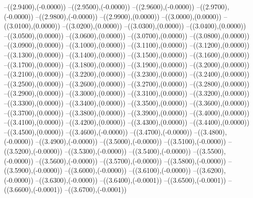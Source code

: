{	--({\sx*(2.9400)},{\sy*(-0.0000)})
	--({\sx*(2.9500)},{\sy*(-0.0000)})
	--({\sx*(2.9600)},{\sy*(-0.0000)})
	--({\sx*(2.9700)},{\sy*(-0.0000)})
	--({\sx*(2.9800)},{\sy*(-0.0000)})
	--({\sx*(2.9900)},{\sy*(0.0000)})
	--({\sx*(3.0000)},{\sy*(0.0000)})
	--({\sx*(3.0100)},{\sy*(0.0000)})
	--({\sx*(3.0200)},{\sy*(0.0000)})
	--({\sx*(3.0300)},{\sy*(0.0000)})
	--({\sx*(3.0400)},{\sy*(0.0000)})
	--({\sx*(3.0500)},{\sy*(0.0000)})
	--({\sx*(3.0600)},{\sy*(0.0000)})
	--({\sx*(3.0700)},{\sy*(0.0000)})
	--({\sx*(3.0800)},{\sy*(0.0000)})
	--({\sx*(3.0900)},{\sy*(0.0000)})
	--({\sx*(3.1000)},{\sy*(0.0000)})
	--({\sx*(3.1100)},{\sy*(0.0000)})
	--({\sx*(3.1200)},{\sy*(0.0000)})
	--({\sx*(3.1300)},{\sy*(0.0000)})
	--({\sx*(3.1400)},{\sy*(0.0000)})
	--({\sx*(3.1500)},{\sy*(0.0000)})
	--({\sx*(3.1600)},{\sy*(0.0000)})
	--({\sx*(3.1700)},{\sy*(0.0000)})
	--({\sx*(3.1800)},{\sy*(0.0000)})
	--({\sx*(3.1900)},{\sy*(0.0000)})
	--({\sx*(3.2000)},{\sy*(0.0000)})
	--({\sx*(3.2100)},{\sy*(0.0000)})
	--({\sx*(3.2200)},{\sy*(0.0000)})
	--({\sx*(3.2300)},{\sy*(0.0000)})
	--({\sx*(3.2400)},{\sy*(0.0000)})
	--({\sx*(3.2500)},{\sy*(0.0000)})
	--({\sx*(3.2600)},{\sy*(0.0000)})
	--({\sx*(3.2700)},{\sy*(0.0000)})
	--({\sx*(3.2800)},{\sy*(0.0000)})
	--({\sx*(3.2900)},{\sy*(0.0000)})
	--({\sx*(3.3000)},{\sy*(0.0000)})
	--({\sx*(3.3100)},{\sy*(0.0000)})
	--({\sx*(3.3200)},{\sy*(0.0000)})
	--({\sx*(3.3300)},{\sy*(0.0000)})
	--({\sx*(3.3400)},{\sy*(0.0000)})
	--({\sx*(3.3500)},{\sy*(0.0000)})
	--({\sx*(3.3600)},{\sy*(0.0000)})
	--({\sx*(3.3700)},{\sy*(0.0000)})
	--({\sx*(3.3800)},{\sy*(0.0000)})
	--({\sx*(3.3900)},{\sy*(0.0000)})
	--({\sx*(3.4000)},{\sy*(0.0000)})
	--({\sx*(3.4100)},{\sy*(0.0000)})
	--({\sx*(3.4200)},{\sy*(0.0000)})
	--({\sx*(3.4300)},{\sy*(0.0000)})
	--({\sx*(3.4400)},{\sy*(0.0000)})
	--({\sx*(3.4500)},{\sy*(0.0000)})
	--({\sx*(3.4600)},{\sy*(-0.0000)})
	--({\sx*(3.4700)},{\sy*(-0.0000)})
	--({\sx*(3.4800)},{\sy*(-0.0000)})
	--({\sx*(3.4900)},{\sy*(-0.0000)})
	--({\sx*(3.5000)},{\sy*(-0.0000)})
	--({\sx*(3.5100)},{\sy*(-0.0000)})
	--({\sx*(3.5200)},{\sy*(-0.0000)})
	--({\sx*(3.5300)},{\sy*(-0.0000)})
	--({\sx*(3.5400)},{\sy*(-0.0000)})
	--({\sx*(3.5500)},{\sy*(-0.0000)})
	--({\sx*(3.5600)},{\sy*(-0.0000)})
	--({\sx*(3.5700)},{\sy*(-0.0000)})
	--({\sx*(3.5800)},{\sy*(-0.0000)})
	--({\sx*(3.5900)},{\sy*(-0.0000)})
	--({\sx*(3.6000)},{\sy*(-0.0000)})
	--({\sx*(3.6100)},{\sy*(-0.0000)})
	--({\sx*(3.6200)},{\sy*(-0.0000)})
	--({\sx*(3.6300)},{\sy*(-0.0000)})
	--({\sx*(3.6400)},{\sy*(-0.0001)})
	--({\sx*(3.6500)},{\sy*(-0.0001)})
	--({\sx*(3.6600)},{\sy*(-0.0001)})
	--({\sx*(3.6700)},{\sy*(-0.0001)})
}
